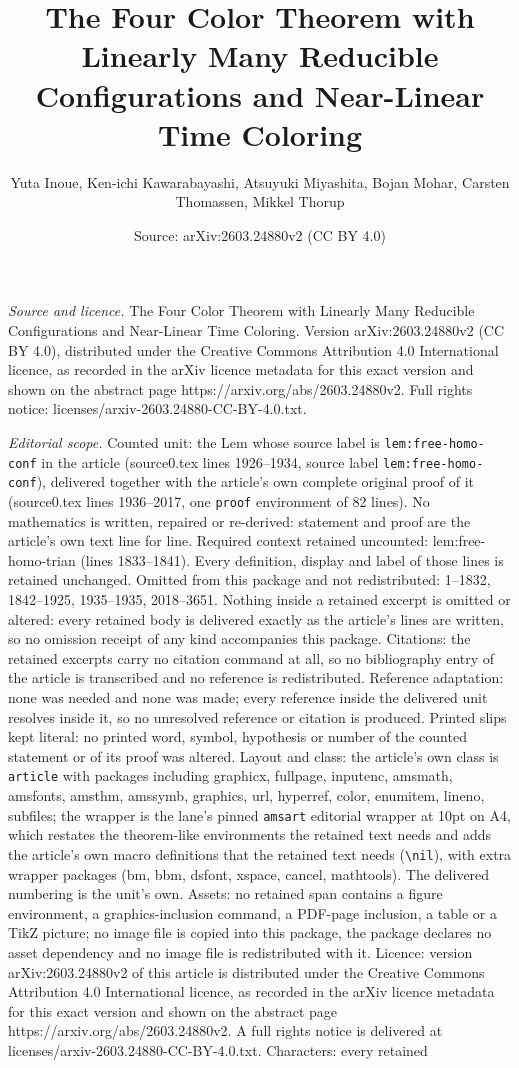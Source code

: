 \documentclass[10pt,a4paper]{amsart}
\title[The Four Color Theorem with Linearly Many Reducible Configur]{The Four Color Theorem with Linearly Many Reducible Configurations and Near-Linear Time Coloring}
\author{Yuta Inoue, Ken-ichi Kawarabayashi, Atsuyuki Miyashita, Bojan Mohar, Carsten Thomassen, Mikkel Thorup}
\date{Source: arXiv:2603.24880v2 (CC BY 4.0)}
\begin{document}
\maketitle

\noindent\emph{Source and licence.} The Four Color Theorem with Linearly Many Reducible Configurations and Near-Linear Time Coloring. Version arXiv:2603.24880v2 (CC BY 4.0), distributed under the Creative Commons Attribution 4.0 International licence, as recorded in the arXiv licence metadata for this exact version and shown on the abstract page https://arxiv.org/abs/2603.24880v2. Full rights notice: licenses/arxiv-2603.24880-CC-BY-4.0.txt.\par\smallskip

\noindent\textit{Editorial scope.} Counted unit: the Lem whose source label is \texttt{lem:free-homo-conf} in the article (source0.tex lines 1926--1934, source label \texttt{lem:free-homo-conf}), delivered together with the article's own complete original proof of it (source0.tex lines 1936--2017, one \texttt{proof} environment of 82 lines). No mathematics is written, repaired or re-derived: statement and proof are the article's own text line for line. Required context retained uncounted: lem:free-homo-trian (lines 1833--1841). Every definition, display and label of those lines is retained unchanged. Omitted from this package and not redistributed: 1--1832, 1842--1925, 1935--1935, 2018--3651. Nothing inside a retained excerpt is omitted or altered: every retained body is delivered exactly as the article's lines are written, so no omission receipt of any kind accompanies this package. Citations: the retained excerpts carry no citation command at all, so no bibliography entry of the article is transcribed and no reference is redistributed. Reference adaptation: none was needed and none was made; every reference inside the delivered unit resolves inside it, so no unresolved reference or citation is produced. Printed slips kept literal: no printed word, symbol, hypothesis or number of the counted statement or of its proof was altered. Layout and class: the article's own class is \texttt{article} with packages including graphicx, fullpage, inputenc, amsmath, amsfonts, amsthm, amssymb, graphics, url, hyperref, color, enumitem, lineno, subfiles; the wrapper is the lane's pinned \texttt{amsart} editorial wrapper at 10pt on A4, which restates the theorem-like environments the retained text needs and adds the article's own macro definitions that the retained text needs (\texttt{\textbackslash nil}), with extra wrapper packages (bm, bbm, dsfont, xspace, cancel, mathtools). The delivered numbering is the unit's own. Assets: no retained span contains a figure environment, a graphics-inclusion command, a PDF-page inclusion, a table or a TikZ picture; no image file is copied into this package, the package declares no asset dependency and no image file is redistributed with it. Licence: version arXiv:2603.24880v2 of this article is distributed under the Creative Commons Attribution 4.0 International licence, as recorded in the arXiv licence metadata for this exact version and shown on the abstract page https://arxiv.org/abs/2603.24880v2. A full rights notice is delivered at licenses/arxiv-2603.24880-CC-BY-4.0.txt. Characters: every retained 
\end{document}
